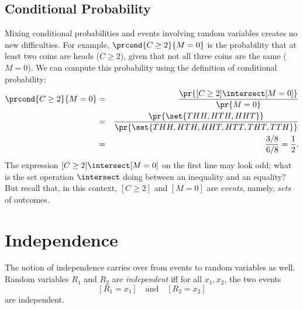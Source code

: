 \begin{editingnotes}
\subsection{Conditional Probability}

Mixing conditional probabilities and events involving random variables
creates no new difficulties.  For example, $\prcond{C \geq 2}{M = 0}$
is the probability that at least two coins are heads ($C \geq 2$),
given that not all three coins are the same ($M = 0$).  We can compute
this probability using the definition of conditional probability:
\begin{eqnarray*}
\prcond{C \geq 2}{M = 0}
        & = &   \frac{\pr{[C \geq 2] \intersect [M = 0]}}{\pr{M = 0}} \\
        & = &   \frac{\pr{\set{THH, HTH, HHT}}}
                        {\pr{\set{THH, HTH, HHT, HTT, THT, TTH }}} \\
        & = &   \frac{3/8}{6/8} = \frac{1}{2}.
\end{eqnarray*}
The expression $[C \geq 2] \intersect [M = 0]$ on the first line may look odd;
what is the set operation $\intersect$ doing between an inequality and an
equality?  But recall that, in this context, $[C \geq 2]$ and $[M = 0]$
are \emph{events}, namely, \emph{sets} of outcomes.

\end{editingnotes}

\section{Independence}

The notion of independence carries over from events to random variables as
well.  Random variables $R_1$ and $R_2$ are  \emph{independent} iff for all $x_1, x_2$, the two events
\[
[R_1 = x_1]  \quad \text{and}  \quad [R_2 = x_2]
\] 
are independent.

\iffalse

 in the codomain of
$R_1$, and $x_2$ in the codomain of $R_2$, we have:
\[
\pr{R_1 = x_1 \QAND\ R_2 = x_2}  =  \pr{R_1 = x_1} \cdot \pr{R_2 = x_2}.
\]
As with events, we can formulate independence for random
variables in an equivalent and perhaps more intuitive way: random
variables $R_1$ and $R_2$ are independent if for all $x_1$ and $x_2$
\[
\prcond{R_1 = x_1}{R_2 = x_2}  =  \pr{R_1 = x_1}.
\]
whenever the lefthand conditional probability is defined, that is,
whenever $\pr{R_2 = x_2} > 0$.
\fi


